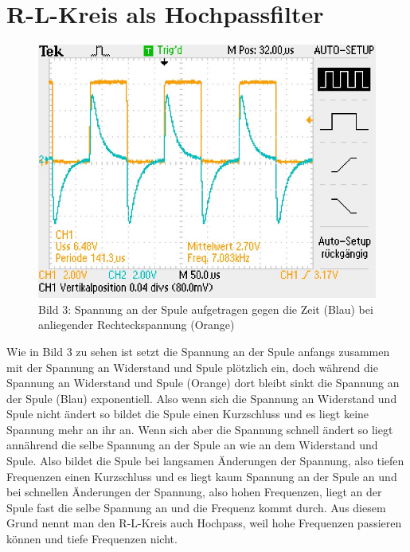 \section{R-L-Kreis als Hochpassfilter}
\begin{figure}[!htb]
    \centering
    \begin{minipage}[t]{0.7\linewidth}
        \centering
        \includegraphics[width=\linewidth]{F0006TEK.jpg}
    \end{minipage}
    \caption*{Bild 3: \small Spannung an der Spule aufgetragen gegen die Zeit (Blau) bei anliegender Rechteckspannung (Orange)}
\end{figure}
Wie in Bild 3 zu sehen ist setzt die Spannung an der Spule anfangs zusammen mit der Spannung an Widerstand und Spule plötzlich ein, doch während die Spannung an Widerstand und Spule (Orange) dort bleibt sinkt die Spannung an der Spule (Blau) exponentiell. Also wenn sich die Spannung an Widerstand und Spule nicht ändert so bildet die Spule einen Kurzschluss und es liegt keine Spannung mehr an ihr an. Wenn sich aber die Spannung schnell ändert so liegt annährend die selbe Spannung an der Spule an wie an dem Widerstand und Spule. Also bildet die Spule bei langsamen Änderungen der Spannung, also tiefen Frequenzen einen Kurzschluss und es liegt kaum Spannung an der Spule an und bei schnellen Änderungen der Spannung, also hohen Frequenzen, liegt an der Spule fast die selbe Spannung an und die Frequenz kommt durch. Aus diesem Grund nennt man den R-L-Kreis auch Hochpass, weil hohe Frequenzen passieren können und tiefe Frequenzen nicht.


